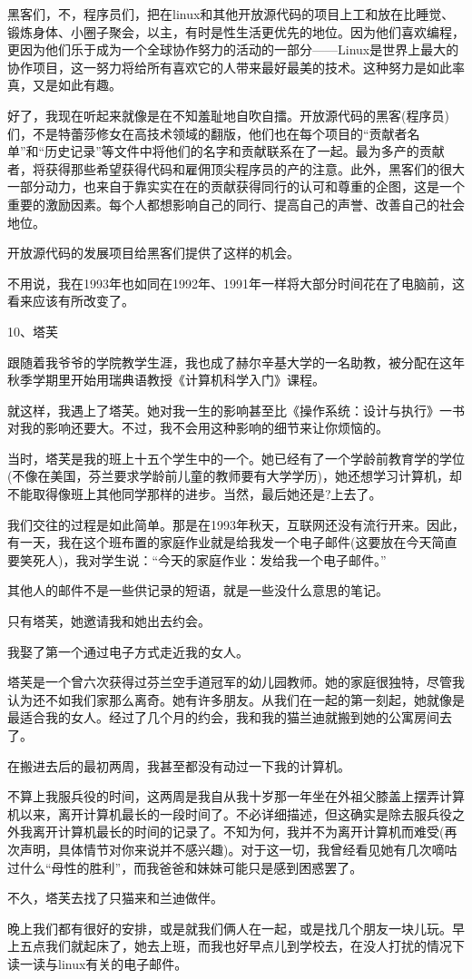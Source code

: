 黑客们，不，程序员们，把在linux和其他开放源代码的项目上工和放在比睡觉、锻炼身体、小圈子聚会，以主，有时是性生活更优先的地位。因为他们喜欢编程，更因为他们乐于成为一个全球协作努力的活动的一部分——Linux是世界上最大的协作项目，这一努力将给所有喜欢它的人带来最好最美的技术。这种努力是如此率真，又是如此有趣。

好了，我现在听起来就像是在不知羞耻地自吹自擂。开放源代码的黑客(程序员)们，不是特蕾莎修女在高技术领域的翻版，他们也在每个项目的“贡献者名单”和“历史记录”等文件中将他们的名字和贡献联系在了一起。最为多产的贡献者，将获得那些希望获得代码和雇佣顶尖程序员的产的注意。此外，黑客们的很大一部分动力，也来自于靠实实在在的贡献获得同行的认可和尊重的企图，这是一个重要的激励因素。每个人都想影响自己的同行、提高自己的声誉、改善自己的社会地位。

开放源代码的发展项目给黑客们提供了这样的机会。

不用说，我在1993年也如同在1992年、1991年一样将大部分时间花在了电脑前，这看来应该有所改变了。

 
10、塔芙

跟随着我爷爷的学院教学生涯，我也成了赫尔辛基大学的一名助教，被分配在这年秋季学期里开始用瑞典语教授《计算机科学入门》课程。

就这样，我遇上了塔芙。她对我一生的影响甚至比《操作系统：设计与执行》一书对我的影响还要大。不过，我不会用这种影响的细节来让你烦恼的。

当时，塔芙是我的班上十五个学生中的一个。她已经有了一个学龄前教育学的学位(不像在美国，芬兰要求学龄前儿童的教师要有大学学历)，她还想学习计算机，却不能取得像班上其他同学那样的进步。当然，最后她还是?上去了。

我们交往的过程是如此简单。那是在1993年秋天，互联网还没有流行开来。因此，有一天，我在这个班布置的家庭作业就是给我发一个电子邮件(这要放在今天简直要笑死人)，我对学生说：“今天的家庭作业：发给我一个电子邮件。”

其他人的邮件不是一些供记录的短语，就是一些没什么意思的笔记。

只有塔芙，她邀请我和她出去约会。

我娶了第一个通过电子方式走近我的女人。

塔芙是一个曾六次获得过芬兰空手道冠军的幼儿园教师。她的家庭很独特，尽管我认为还不如我们家那么离奇。她有许多朋友。从我们在一起的第一刻起，她就像是最适合我的女人。经过了几个月的约会，我和我的猫兰迪就搬到她的公寓房间去了。

在搬进去后的最初两周，我甚至都没有动过一下我的计算机。

不算上我服兵役的时间，这两周是我自从我十岁那一年坐在外祖父膝盖上摆弄计算机以来，离开计算机最长的一段时间了。不必详细描述，但这确实是除去服兵役之外我离开计算机最长的时间的记录了。不知为何，我并不为离开计算机而难受(再次声明，具体情节对你来说并不感兴趣)。对于这一切，我曾经看见她有几次嘀咕过什么“母性的胜利”，而我爸爸和妹妹可能只是感到困惑罢了。

不久，塔芙去找了只猫来和兰迪做伴。

晚上我们都有很好的安排，或是就我们俩人在一起，或是找几个朋友一块儿玩。早上五点我们就起床了，她去上班，而我也好早点儿到学校去，在没人打扰的情况下读一读与linux有关的电子邮件。
